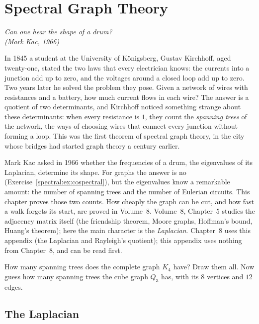 \chapter{Spectral Graph Theory}

\begin{center}\itshape
Can one hear the shape of a drum?\\
\upshape(Mark Kac, 1966)
\end{center}

In 1845 a student at the University of K\"onigsberg, Gustav Kirchhoff, aged twenty-one, stated the two laws that every
electrician knows: the currents into a junction add up to zero, and the voltages around a closed loop add up to zero. Two
years later he solved the problem they pose. Given a network of wires with resistances and a battery, how much current
flows in each wire? The answer is a quotient of two determinants, and Kirchhoff noticed something strange about these
determinants: when every resistance is $1$, they count the \emph{spanning trees} of the network, the ways of choosing
wires that connect every junction without forming a loop. This was the first theorem of spectral graph theory, in the city
whose bridges had started graph theory a century earlier.

Mark Kac asked in 1966 whether the frequencies of a drum, the eigenvalues of its Laplacian, determine its shape. For
graphs the answer is no (Exercise~\ref{spectral:ex:cospectral}), but the eigenvalues know a remarkable amount: the number of spanning
trees and the number of Eulerian circuits. This chapter proves those two counts. How cheaply the graph can be cut, and how fast a walk forgets its start, are proved in Volume~8.
Volume~8, Chapter~5 studies the adjacency matrix itself (the friendship theorem, Moore graphs,
Hoffman's bound, Huang's theorem); here the main character is the \emph{Laplacian}. Chapter~8 uses this appendix (the Laplacian and Rayleigh's quotient); this appendix uses nothing from Chapter~8, and can be read first.

\begin{think}
How many spanning trees does the complete graph $K_4$ have? Draw them all. Now guess how many spanning trees the cube graph
$Q_3$ has, with its $8$ vertices and $12$ edges.
\end{think}

\section{The Laplacian}


